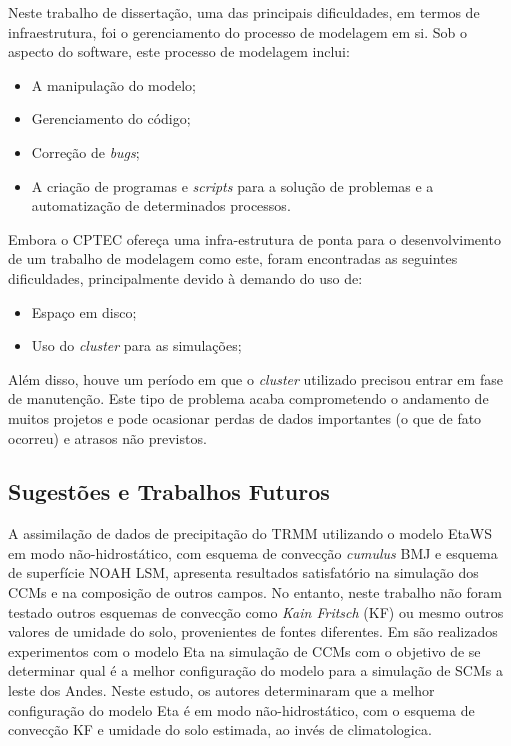 Neste trabalho de dissertação, uma das principais dificuldades, em termos de infraestrutura, foi o gerenciamento do processo de modelagem em si. Sob o aspecto do software, este processo de modelagem inclui:

\begin{itemize}
\item A manipulação do modelo;
\item Gerenciamento do código;
\item Correção de \textit{bugs};
\item A criação de programas e \textit{scripts} para a solução de problemas e a \-au\-to\-ma\-ti\-za\-ção de determinados processos.
\end{itemize}

Embora o CPTEC ofereça uma infra-estrutura de ponta para o desenvolvimento de um trabalho de modelagem como este, foram encontradas as seguintes dificuldades, principalmente devido à demando do uso de:

\begin{itemize}
\item Espaço em disco;
\item Uso do \textit{cluster} para as simulações;
\end{itemize}

Além disso, houve um período em que o \textit{cluster} utilizado precisou entrar em fase de manutenção. Este tipo de problema acaba comprometendo o andamento de muitos projetos e pode ocasionar perdas de dados importantes (o que de fato ocorreu) e atrasos não previstos.

\subsection{Sugestões e Trabalhos Futuros}

A assimilação de dados de precipitação do TRMM utilizando o modelo EtaWS em modo não-hidrostático, com esquema de convecção \textit{cumulus} BMJ e esquema de superfície NOAH LSM, apresenta resultados satisfatório na simulação dos CCMs e na composição de outros campos. No entanto, neste trabalho não foram testado outros esquemas de convecção como \textit{Kain Fritsch} (KF) ou mesmo outros valores de umidade do solo, provenientes de fontes diferentes. Em \cite{rozantecavalcanti08} são realizados experimentos com o modelo Eta na simulação de CCMs com o objetivo de se determinar qual é a melhor configuração do modelo para a simulação de SCMs a leste dos Andes. Neste estudo, os autores determinaram que a melhor configuração do modelo Eta é em modo não-hidrostático, com o esquema de convecção KF e umidade do solo estimada, ao invés de climatologica.

